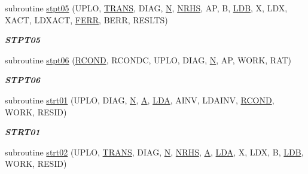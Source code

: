 \begin{DoxyCompactItemize}
subroutine \hyperlink{group__single__lin_gaf493e82081266e8ccc0cc507a73daf5e}{stpt05} (U\+P\+L\+O, \hyperlink{superlu__enum__consts_8h_a0c4e17b2d5cea33f9991ccc6a6678d62a1f61e3015bfe0f0c2c3fda4c5a0cdf58}{T\+R\+A\+N\+S}, D\+I\+A\+G, \hyperlink{polmisc_8c_a0240ac851181b84ac374872dc5434ee4}{N}, \hyperlink{example__user_8c_aa0138da002ce2a90360df2f521eb3198}{N\+R\+H\+S}, A\+P, B, \hyperlink{example__user_8c_a50e90a7104df172b5a89a06c47fcca04}{L\+D\+B}, X, L\+D\+X, X\+A\+C\+T, L\+D\+X\+A\+C\+T, \hyperlink{superlu__enum__consts_8h_af00a42ecad444bbda75cde1b64bd7e72a78fd14d7abebae04095cfbe02928f153}{F\+E\+R\+R}, B\+E\+R\+R, R\+E\+S\+L\+T\+S)
\begin{DoxyCompactList}\small\item\em {\bfseries S\+T\+P\+T05} \end{DoxyCompactList}\item 
subroutine \hyperlink{group__single__lin_gac0f3740d9d14489df17b2ad45a8470d1}{stpt06} (\hyperlink{superlu__enum__consts_8h_af00a42ecad444bbda75cde1b64bd7e72a9b5c151728d8512307565994c89919d5}{R\+C\+O\+N\+D}, R\+C\+O\+N\+D\+C, U\+P\+L\+O, D\+I\+A\+G, \hyperlink{polmisc_8c_a0240ac851181b84ac374872dc5434ee4}{N}, A\+P, W\+O\+R\+K, R\+A\+T)
\begin{DoxyCompactList}\small\item\em {\bfseries S\+T\+P\+T06} \end{DoxyCompactList}\item 
subroutine \hyperlink{group__single__lin_gacfe2e68c6d64e7cf0f6c0ca4bced3ca0}{strt01} (U\+P\+L\+O, D\+I\+A\+G, \hyperlink{polmisc_8c_a0240ac851181b84ac374872dc5434ee4}{N}, \hyperlink{classA}{A}, \hyperlink{example__user_8c_ae946da542ce0db94dced19b2ecefd1aa}{L\+D\+A}, A\+I\+N\+V, L\+D\+A\+I\+N\+V, \hyperlink{superlu__enum__consts_8h_af00a42ecad444bbda75cde1b64bd7e72a9b5c151728d8512307565994c89919d5}{R\+C\+O\+N\+D}, W\+O\+R\+K, R\+E\+S\+I\+D)
\begin{DoxyCompactList}\small\item\em {\bfseries S\+T\+R\+T01} \end{DoxyCompactList}\item 
subroutine \hyperlink{group__single__lin_gaad3096c9382bc12d2f559c6bf5b42092}{strt02} (U\+P\+L\+O, \hyperlink{superlu__enum__consts_8h_a0c4e17b2d5cea33f9991ccc6a6678d62a1f61e3015bfe0f0c2c3fda4c5a0cdf58}{T\+R\+A\+N\+S}, D\+I\+A\+G, \hyperlink{polmisc_8c_a0240ac851181b84ac374872dc5434ee4}{N}, \hyperlink{example__user_8c_aa0138da002ce2a90360df2f521eb3198}{N\+R\+H\+S}, \hyperlink{classA}{A}, \hyperlink{example__user_8c_ae946da542ce0db94dced19b2ecefd1aa}{L\+D\+A}, X, L\+D\+X, B, \hyperlink{example__user_8c_a50e90a7104df172b5a89a06c47fcca04}{L\+D\+B}, W\+O\+R\+K, R\+E\+S\+I\+D)

\end{DoxyCompactItemize}
